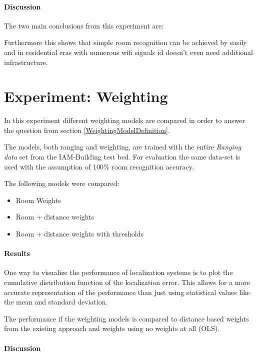 
\paragraph{Discussion}

The two main conclusions from this experiment are:



Furthermore this shows that simple room recognition can be achieved by easily and in residential eras with numerous wifi signals id doesn't even need additional infrastructure.
\section{Experiment: Weighting}
In this experiment different weighting models are compared in order to answer the question from section \ref{WeightingModelDefinition}.

The models, both ranging and weighting, are trained with the entire \emph{Ranging data} set from the IAM-Building test bed. For evaluation the same data-set is used with the assumption of 100\% room recognition accuracy.

The following models were compared:

\begin{itemize}
\item Room Weights
\item Room + distance weights
\item Room + distance weights with thresholds

\end{itemize}

\paragraph{Results}
One way to visualize the performance of localization systems is to plot the cumulative distribution function of the localization error. This allows for a more accurate representation of the performance than just using statistical values like the mean and standard deviation.

The performance if the weighting models is compared to distance based weights from the existing approach and weights using no weights at all (OLS).

\paragraph{Discussion}

